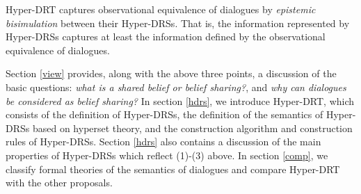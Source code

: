 Hyper-DRT captures observational equivalence of dialogues by {\it epistemic bisimulation} between their Hyper-DRSs.
That is, the information represented by Hyper-DRSs captures at least the information defined by the observational equivalence of dialogues.
\par
Section \ref{view} provides, along with the above three points, a discussion of the basic questions: {\it what is a shared belief or belief sharing?}, and  {\it why can dialogues be considered as belief sharing?}
In section \ref{hdrs}, we introduce Hyper-DRT, which consists of the definition of Hyper-DRSs, the definition of the semantics of Hyper-DRSs based on hyperset theory, and the construction algorithm and construction rules of Hyper-DRSs.
Section \ref{hdrs} also contains a discussion of the main properties of Hyper-DRSs which reflect (1)-(3) above.
In section \ref{comp}, we classify formal theories of the semantics of dialogues and compare Hyper-DRT with the other proposals.


